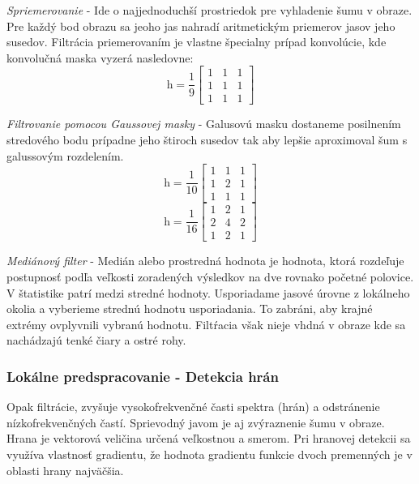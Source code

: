 \textit{Spriemerovanie} - Ide o najjednoduchší prostriedok pre vyhladenie šumu v obraze. Pre každý bod obrazu sa jeoho jas nahradí aritmetickým priemerov jasov jeho susedov. Filtrácia priemerovaním je vlastne špecialny prípad konvolúcie, kde konvolučná maska vyzerá nasledovne:
$$\textit{h}=\frac{1}{9}\begin{bmatrix} 1 & 1 & 1 \\ 1 & 1 & 1 \\ 1 & 1 & 1  \end{bmatrix}$$

\textit{Filtrovanie pomocou Gaussovej masky} - Galusovú masku dostaneme posilnením stredového bodu prípadne jeho štiroch susedov tak aby lepšie aproximoval šum s galussovým rozdelením.
$$\textit{h}=\frac{1}{10}\begin{bmatrix} 1 & 1 & 1 \\ 1 & 2 & 1 \\ 1 & 1 & 1  \end{bmatrix}$$
$$\textit{h}=\frac{1}{16}\begin{bmatrix} 1 & 2 & 1 \\ 2 & 4 & 2 \\ 1 & 2 & 1  \end{bmatrix}$$

\textit{Mediánový filter} - Medián alebo prostredná hodnota je hodnota, ktorá rozdeľuje postupnosť podľa veľkosti zoradených výsledkov na dve rovnako početné polovice. V štatistike patrí medzi stredné hodnoty. Usporiadame jasové úrovne z lokálneho okolia a vyberieme strednú hodnotu usporiadania. To zabráni, aby krajné extrémy ovplyvnili vybranú hodnotu. Filtŕacia však nieje vhdná v obraze kde sa nachádzajú tenké čiary a ostré rohy. 


\subsubsection{Lokálne predspracovanie - Detekcia hrán}
Opak filtrácie, zvyšuje vysokofrekvenčné časti spektra (hrán) a odstránenie nízkofrekvenčných častí. Sprievodný javom je aj zvýraznenie šumu v obraze.  Hrana je vektorová veličina určená veľkostnou a smerom. Pri hranovej detekcii sa využíva vlastnosť gradientu, že hodnota gradientu funkcie dvoch premenných je v oblasti hrany najväčšia. 

